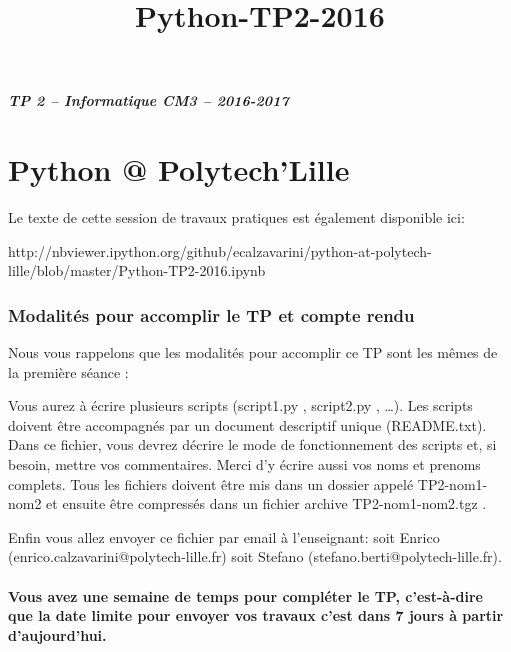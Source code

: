 \documentclass{article}
\title{Python-TP2-2016}
\begin{document}
    
    \date{} 
    \maketitle
    
    

    
    \subparagraph{TP 2 -- Informatique CM3 --
2016-2017}\label{tp-2-informatique-cm3-2016-2017}

    \section{Python @ Polytech'Lille}\label{python-polytechlille}

    Le texte de cette session de travaux pratiques est également disponible
ici:

http://nbviewer.ipython.org/github/ecalzavarini/python-at-polytech-lille/blob/master/Python-TP2-2016.ipynb

    \subsubsection{Modalités pour accomplir le TP et compte
rendu}\label{modalituxe9s-pour-accomplir-le-tp-et-compte-rendu}

    Nous vous rappelons que les modalités pour accomplir ce TP sont les
mêmes de la première séance :

    Vous aurez à écrire plusieurs scripts (script1.py , script2.py ,
\ldots{}). Les scripts doivent être accompagnés par un document
descriptif unique (README.txt). Dans ce fichier, vous devrez décrire le
mode de fonctionnement des scripts et, si besoin, mettre vos
commentaires. Merci d'y écrire aussi vos noms et prenoms complets. Tous
les fichiers doivent être mis dans un dossier appelé TP2-nom1-nom2 et
ensuite être compressés dans un fichier archive TP2-nom1-nom2.tgz .

Enfin vous allez envoyer ce fichier par email à l'enseignant: soit
Enrico (enrico.calzavarini@polytech-lille.fr) soit Stefano
(stefano.berti@polytech-lille.fr).

    \paragraph{Vous avez une semaine de temps pour compléter le TP,
c'est-à-dire que la date limite pour envoyer vos travaux c'est dans 7
jours à partir
d'aujourd'hui.}\label{vous-avez-une-semaine-de-temps-pour-compluxe9ter-le-tp-cest-uxe0-dire-que-la-date-limite-pour-envoyer-vos-travaux-cest-dans-7-jours-uxe0-partir-daujourdhui.}
\end{document}
